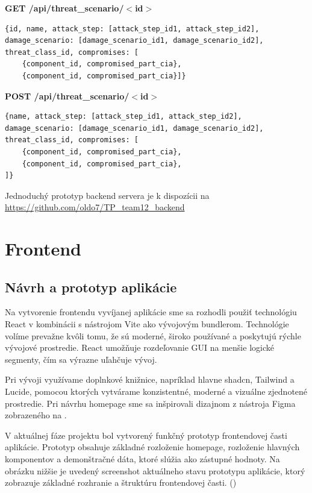 \documentclass[11pt]{article}
\begin{document}
\vspace{1cm}
\textbf{GET /api/threat\_scenario/$<$id$>$} 
\begin{verbatim}
{id, name, attack_step: [attack_step_id1, attack_step_id2], 
damage_scenario: [damage_scenario_id1, damage_scenario_id2], 
threat_class_id, compromises: [
	{component_id, compromised_part_cia},
	{component_id, compromised_part_cia}]}
\end{verbatim}

\vspace{1cm}
\textbf{POST /api/threat\_scenario/$<$id$>$} 
\begin{verbatim}
{name, attack_step: [attack_step_id1, attack_step_id2], 
damage_scenario: [damage_scenario_id1, damage_scenario_id2], 
threat_class_id, compromises: [
	{component_id, compromised_part_cia},
	{component_id, compromised_part_cia},
]}
\end{verbatim}

\vspace{2cm}
Jednoduchý prototyp backend servera je k dispozícii na \url{https://github.com/oldo7/TP_team12_backend}

\section{Frontend}
\subsection{Návrh a prototyp aplikácie}
Na vytvorenie frontendu vyvíjanej aplikácie sme sa rozhodli použiť technológiu React v kombinácii s nástrojom Vite ako vývojovým bundlerom. Technológie volíme prevažne kvôli tomu, že sú moderné, široko používané a poskytujú rýchle vývojové prostredie. React umožňuje rozdeľovanie GUI na menšie logické segmenty, čím sa výrazne uľahčuje vývoj.

Pri vývoji využívame doplnkové knižnice, napríklad hlavne shadcn, Tailwind a Lucide, pomocou ktorých vytvárame konzistentné, moderné a vizuálne zjednotené prostredie. Pri návrhu homepage sme sa inšpirovali dizajnom z nástroja Figma zobrazeného na .

V aktuálnej fáze projektu bol vytvorený funkčný prototyp frontendovej časti aplikácie. Prototyp obsahuje základné rozloženie homepage, rozloženie hlavných komponentov a demonštračné dáta, ktoré slúžia ako zástupné hodnoty. Na obrázku nižšie je uvedený screenshot aktuálneho stavu prototypu aplikácie, ktorý zobrazuje základné rozhranie a štruktúru frontendovej časti. ()
\end{document}
